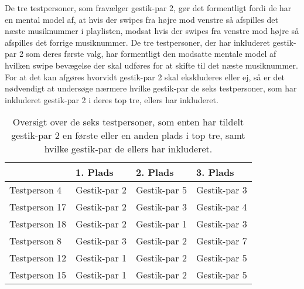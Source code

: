 De tre testpersoner, som fravælger gestik-par 2, gør det formentligt fordi de har en mental model af, at hvis der swipes fra højre mod venstre så afspilles det næste musiknummer i playlisten, modsat hvis der swipes fra venstre mod højre så afspilles det forrige musiknummer. De tre testpersoner, der har inkluderet gestik-par 2 som deres første valg, har formentligt den modsatte mentale model af hvilken swipe bevægelse der skal udføres for at skifte til det næste musiknummer. For at det kan afgøres hvorvidt gestik-par 2 skal ekskluderes eller ej, så er det nødvendigt at undersøge nærmere hvilke gestik-par de seks testpersoner, som har inkluderet gestik-par 2 i deres top tre, ellers har inkluderet. 
%
\begin{table}[H]
	\centering
	\begin{tabular}{ | p{3cm} | p{3cm} | p{3cm} | p{3cm} |}
	\hline
		 & 1. Plads & 2. Plads & 3. Plads \\ \hline
		Testperson 4 & Gestik-par 2 & Gestik-par 5 & Gestik-par 3 \\ \hline
		Testperson 17 & Gestik-par 2 & Gestik-par 3 & Gestik-par 4 \\ \hline
		Testperson 18 & Gestik-par 2 & Gestik-par 1 & Gestik-par 3 \\ \hline
		Testperson 8 & Gestik-par 3 & Gestik-par 2 & Gestik-par 7 \\ \hline
		Testperson 12 & Gestik-par 1 & Gestik-par 2 & Gestik-par 5\\ \hline
		Testperson 15 & Gestik-par 1 & Gestik-par 2 & Gestik-par 5 \\ \hline
	\end{tabular}
	\caption{Oversigt over de seks testpersoner, som enten har tildelt gestik-par 2 en første eller en anden plads i top tre, samt hvilke gestik-par de ellers har inkluderet.}
	\label{tab:GestikPar2ITopTre}
\end{table}
\noindent
%
